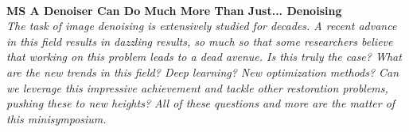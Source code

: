 \begin{multicols}{2}
\\ 
        \\
        \\\\
        \\
        \\\\
        \\
        \\\\
\\
\end{multicols}
  \noindent\textbf{MS A Denoiser Can Do Much More Than Just... Denoising}\\
  \textit{The task of image denoising is extensively studied for decades. A recent advance in this field results in dazzling results, so much so that some researchers believe that working on this problem leads to a dead avenue. Is this truly the case? What are the new trends in this field? Deep learning? New optimization methods? Can we leverage this impressive achievement and tackle other restoration problems, pushing these to new heights? All of these questions and more are the matter of this minisymposium.} \\
    
